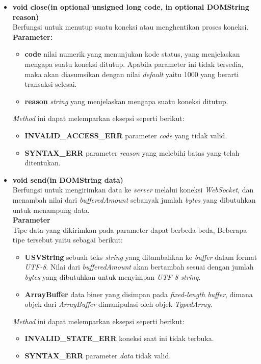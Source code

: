\begin{itemize}
	\item \textbf{void close(in optional unsigned long code, in optional DOMString reason)} \\ Berfungsi untuk menutup suatu koneksi atau menghentikan proses koneksi. \\ \textbf{Parameter:} 
		\begin{itemize}
			\item \textbf{code} nilai numerik yang menunjukan kode status, yang menjelaskan mengapa suatu koneksi ditutup. Apabila parameter ini tidak tersedia, maka akan diasumsikan dengan nilai \textit{default} yaitu 1000 yang berarti transaksi selesai.
			\item \textbf{reason} \textit{string} yang menjelaskan mengapa suatu koneksi ditutup. 
		\end{itemize}
	\textit{Method} ini dapat melemparkan eksepsi seperti berikut:
		\begin{itemize}
			\item \textbf{INVALID\_ACCESS\_ERR} parameter \textit{code} yang tidak valid.
			\item \textbf{SYNTAX\_ERR} parameter \textit{reason} yang melebihi batas yang telah ditentukan.
		\end{itemize}
	
	\item \textbf{void send(in DOMString data)} \\ Berfungsi untuk mengirimkan data ke \textit{server} melalui koneksi \textit{WebSocket}, dan menambah nilai dari \textit{bufferedAmount} sebanyak jumlah \textit{bytes} yang dibutuhkan untuk menampung data. \\ \textbf{Parameter} \\ Tipe data yang dikirimkan pada parameter dapat berbeda-beda, Beberapa tipe tersebut yaitu sebagai berikut:
	
		\begin{itemize}
			\item \textbf{USVString} sebuah teks \textit{string} yang ditambahkan ke \textit{buffer} dalam format \textit{UTF-8}. Nilai dari \textit{bufferedAmount} akan bertambah sesuai dengan jumlah \textit{bytes} yang dibutuhkan untuk menyimpan \textit{UTF-8 string}.
			
			\item \textbf{ArrayBuffer} data biner yang disimpan pada \textit{fixed-length buffer}, dimana objek dari \textit{ArrayBuffer} dimanipulasi oleh objek \textit{TypedArray}.
		\end{itemize}
	\textit{Method} ini dapat melemparkan eksepsi seperti berikut:
	\begin{itemize}
		\item \textbf{INVALID\_STATE\_ERR} koneksi saat ini tidak terbuka.
		\item \textbf{SYNTAX\_ERR} parameter \textit{data} tidak valid.
	\end{itemize}
\end{itemize}

